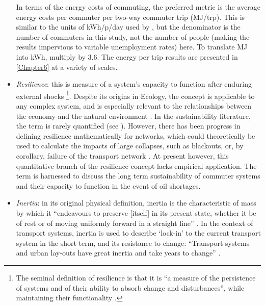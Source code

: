 \documentclass[a4paper, 11pt, twoside]{Thesis}
\begin{document}
\begin{itemize}
In terms of the energy costs of commuting, the preferred metric is the average
energy costs per commuter per two-way commuter trip (MJ/trp).
This is similar to the units of kWh/p/day used by \citet{Boussauw2009},
but the denominator is the number of commuters in this study, not the number
of people (making the results impervious to variable unemployment rates) here.
To translate MJ into kWh, multiply by 3.6.
The energy per trip results are presented in \cref{Chapter6} at a variety of scales.

\item \emph{Resilience}: this is measure of a system's capacity to function
after enduring external shocks \citep{Holling1973}\footnote{The seminal
definition of resilience is that it is ``a measure of the persistence
of systems and of their ability to absorb change and disturbances'', while
maintaining their functionality \citep[p. 14]{Holling1973}.
}.
Despite its origins in Ecology, the concept is applicable to any complex
system, and is especially relevant to the relationships between the
economy and the natural environment \citep{Holling2001}. In the sustainability
literature, the term is rarely quantified (see \citealp{Bridge2010}). However,
there has been progress in defining resilience mathematically for 
networks, which could theoretically be used to calculate the impacts of
large collapses, such as blackouts, or, by corollary, failure of the transport
network \citep{Barthelemy2011}. At present however, this quantitative branch of
the resilience concept lacks empirical application. The term is harnessed to
discuss the long term sustainability of commuter systems and their capacity to
function in the event of oil shortages.

\item \emph{Inertia}: in its original physical definition, inertia is the
characteristic of mass by which it ``endeavours to preserve [itself] in its
present state, whether it be of rest or of moving uniformly forward in a
straight line'' \citep[p. 73]{Newton1848}. In the context of transport systems,
inertia is used to describe `lock-in' to the current
transport system in the short term, and its resistance to change:
``Transport systems and urban lay-outs have great inertia and take years to
change'' \citep[p. 365]{Chapman2007}.
\end{itemize}
\end{document}
